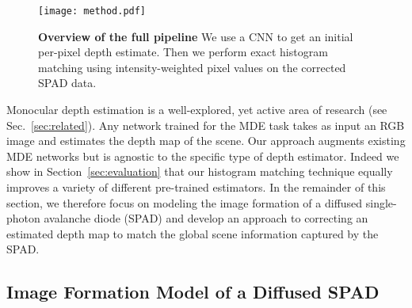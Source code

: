 \begin{figure}
  \centering
  \texttt{[image: method.pdf]}
  \caption{\textbf{Overview of the full pipeline} We use a CNN to get an initial
  per-pixel depth estimate. Then we perform exact histogram matching using
  intensity-weighted pixel values on the corrected SPAD data.}
\end{figure}

Monocular depth estimation is a well-explored, yet active area of research (see Sec.~\ref{sec:related}). Any network trained for the MDE task takes as input an RGB image and estimates the depth map of the scene. Our approach augments existing MDE networks but is agnostic to the specific type of depth estimator. Indeed we show in Section~\ref{sec:evaluation} that our histogram matching technique equally improves a variety of different pre-trained estimators. In the remainder of this section, we therefore focus on modeling the image formation of a diffused single-photon avalanche diode (SPAD) and develop an approach to correcting an estimated depth map to match the global scene information captured by the SPAD.


\subsection{Image Formation Model of a Diffused SPAD}

